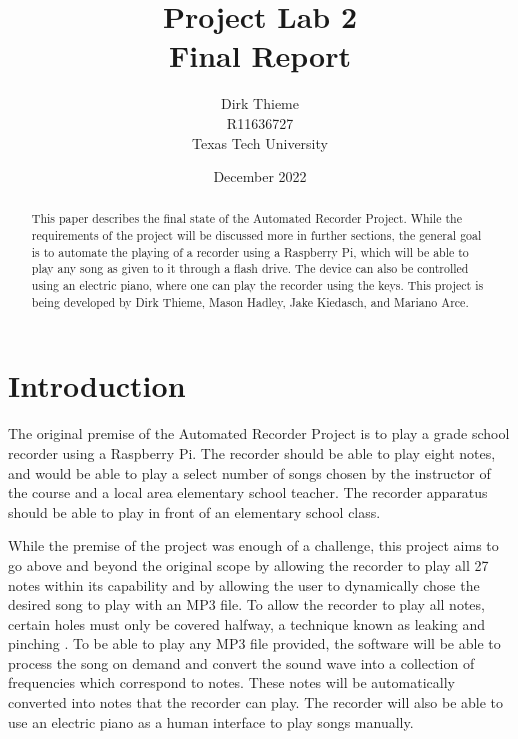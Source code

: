 \documentclass[UTF8, 12pt]{article}
\title{Project Lab 2\\\large Final Report}
\author{Dirk Thieme\\R11636727\\Texas Tech University}
\date{December 2022}
\begin{document}
\maketitle
{}
\newpage
{}

\begin{abstract}
    This paper describes the final state of the Automated Recorder Project. While the requirements of the project will be discussed more in further sections, the general goal is to automate the playing of a recorder using a Raspberry Pi, which will be able to play any song as given to it through a flash drive. The device can also be controlled using an electric piano, where one can play the recorder using the keys. This project is being developed by Dirk Thieme, Mason Hadley, Jake Kiedasch, and Mariano Arce.
\end{abstract}

\newpage
\tableofcontents

\newpage
\listoffigures


\newpage
\section{Introduction}
    The original premise of the Automated Recorder Project is to play a grade school recorder using a Raspberry Pi. The recorder should be able to play eight notes, and would be able to play a select number of songs chosen by the instructor of the course and a local area elementary school teacher. The recorder apparatus should be able to play in front of an elementary school class.

    While the premise of the project was enough of a challenge, this project aims to go above and beyond the original scope by allowing the recorder to play all 27 notes within its capability and by allowing the user to dynamically chose the desired song to play with an MP3 file. To allow the recorder to play all notes, certain holes must only be covered halfway, a technique known as leaking and pinching \cite{rec_wiki}. To be able to play any MP3 file provided, the software will be able to process the song on demand and convert the sound wave into a collection of frequencies which correspond to notes. These notes will be automatically converted into notes that the recorder can play. The recorder will also be able to use an electric piano as a human interface to play songs manually.
\end{document}
